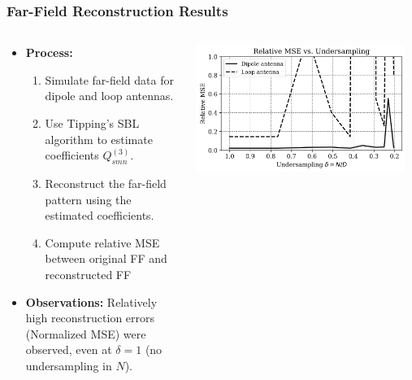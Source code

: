 \documentclass{beamer}
\begin{document}
\begin{frame}
    \frametitle{Far-Field Reconstruction Results}
    \begin{columns}
        \begin{column}{0.5\textwidth}
            \begin{itemize}
                \item \textbf{Process:}
                \begin{enumerate}
                    \item Simulate far-field data for dipole and loop antennas.
                    \item Use Tipping's SBL algorithm to estimate coefficients $Q_{smn}^{(3)}$.
                    \item Reconstruct the far-field pattern using the estimated coefficients.
                    \item Compute relative MSE between original FF and reconstructed FF
                \end{enumerate}
                \item \textbf{Observations:} Relatively high reconstruction errors (Normalized MSE) were observed, even at $\delta = 1$ (no undersampling in $N$).
            \end{itemize}
        \end{column}
        \begin{column}{0.5\textwidth}
            \centering
            \includegraphics[width=0.95\textwidth]{Figures/delta_vs_mse_ff.png}
            \label{fig:mse_ff}
        \end{column}
    \end{columns}
\end{frame}
\end{document}
